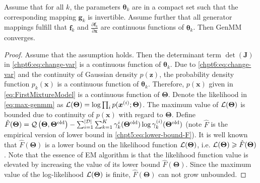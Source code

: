 \begin{proposition}
  Assume that for all $k$, the parameters $\bm{\theta}_k$ are in a compact set such that the corresponding mapping $\bm{g}_k$ is invertible. Assume further that all generator mappings fulfill that $\bm{f}_k$ and $\frac{\partial \bm{f}_k}{\partial \bm{x}}$ are continuous functions of $\bm{\theta}_k$. Then GenMM converges. 
\end{proposition}
\begin{proof}
  Assume that the assumption holds. Then the determinant term $\det(\bm{J})$ in \eqref{chpt6:eq:change-var} is a continuous function of $\bm{\theta}_k$. Due to \eqref{chpt6:eq:change-var} and the continuity of Gaussian density $p(\bm{z})$, the probability density function $p_k(\bm{x})$ is a continuous function of $\bm{\theta}_k$. Therefore, $p(\bm{x})$ given in \eqref{eq:FirstMixtureModel} is a continuous function of $\bm{\Theta}$. Denote the likelihood in \eqref{eq:max-genmm} as $\mathcal{L}(\bm{\Theta})=\log \textstyle\prod_{i} p(\bm{x}^{(i)};\bm{\Theta})$. The maximum value of $\mathcal{L}(\bm{\Theta})$ is bounded due to continuity of $p(\bm{x})$ with regard to $\bm{\Theta}$.
  Define $\hat{F}(\bm{\Theta}) = \mathcal{Q}\left(\bm{\Theta},\bm{\Theta}^{\mathrm{old}}\right) - \sum_{i=1}^{| \mathcal{D} |}\sum_{k=1}^{K}\gamma_k^{i}(\bm{\Theta}^{\mathrm{old}}) \log\gamma_k^{(i)}(\bm{\Theta}^{\mathrm{old}})$ (note $\hat{F}$ is the empirical version of lower bound in \eqref{chpt5:eq:lower-bound-F}). It is well known that $\hat{F}(\bm{\Theta})$ is a lower bound on the likelihood function $\mathcal{L}(\bm{\Theta})$, i.e. $\mathcal{L}(\bm{\Theta}) \geqslant \hat{F}(\bm{\Theta})$. Note that the essence of EM algorithm is that the likelihood function value is elevated by increasing the value of its lower bound $\hat{F}(\bm{\Theta})$. Since the maximum value of the log-likelihood $\mathcal{L}(\bm{\Theta})$ is finite, $\hat{F}(\bm{\Theta})$ can not grow unbounded.

\end{proof}


